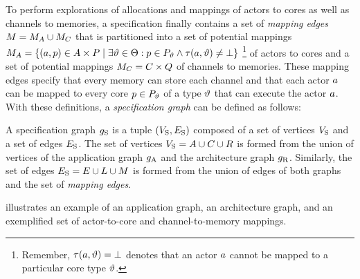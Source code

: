 To perform explorations of allocations and mappings of actors to cores as well as channels to memories, a specification finally contains a set of \emph{mapping edges} $M = M_A \cup M_C$ that is partitioned into a set of potential mappings $M_A = \{ (a, p) \in  A \times P \mid \exists \vartheta \in \Theta: p \in P_\vartheta \land \tau(a, \vartheta) \neq \bot \}$%
\footnote{Remember, $\tau(a, \vartheta) = \bot$ denotes that an actor $a$ cannot be mapped to a particular core type $\vartheta$.}
of actors to cores and a set of potential mappings $M_C = C \times Q$ of channels to memories.
These mapping edges specify that every memory can store each channel and that each actor $a$ can be mapped to every core $p \in P_\vartheta$ of a type $\vartheta$ that can execute the actor $a$.
With these definitions, a \emph{specification graph} can be defined as follows:
\begin{definition}
A specification graph $g_\textrm{S}$ is a tuple $(V_\textrm{S}, E_\textrm{S})$ composed of a set of vertices $V_\textrm{S}$ and a set of edges $E_\textrm{S}$.
The set of vertices $V_\textrm{S} = A \cup C \cup R$ is formed from the union of vertices of the application graph $g_\textrm{A}$ and the architecture graph $g_\textrm{R}$.
Similarly, the set of edges $E_\textrm{S} = E \cup L \cup M$ is formed from the union of edges of both graphs and the set of \emph{mapping edges}.
\end{definition}
 illustrates an example of an application graph, an architecture graph, and an exemplified set of actor-to-core and channel-to-memory mappings.
